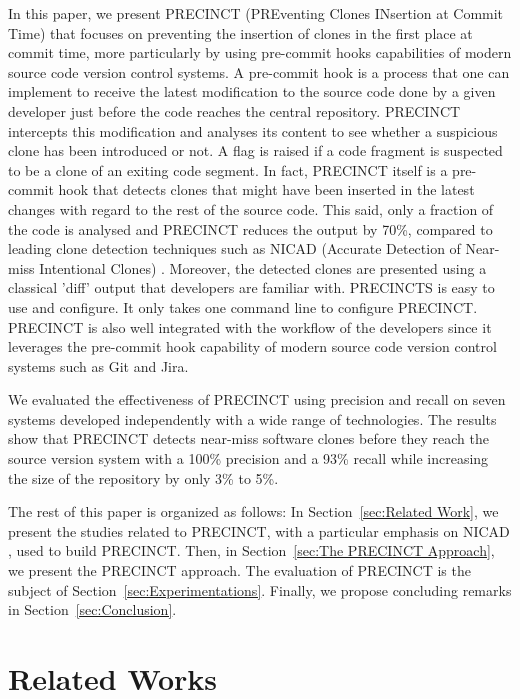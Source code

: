 \documentclass[conference]{IEEEtran}
\begin{document}
In this paper, we present PRECINCT (PREventing Clones INsertion at Commit Time) that focuses on preventing the insertion of clones in the first place at commit time, more particularly by  using pre-commit hooks capabilities of modern source code version control systems. A pre-commit hook is a process that one can implement to receive the latest modification to the source code done by a given developer just before the code reaches the central repository.  PRECINCT intercepts this modification and analyses its  content to see whether a suspicious clone has been introduced or not. A flag is raised if a code fragment is suspected to be a clone of an exiting code segment. In fact, PRECINCT itself is a pre-commit hook that detects clones that might have been inserted in the latest changes with regard to the rest of the source code. This said, only a fraction of the code is analysed and PRECINCT reduces the output by 70\%, compared to leading clone detection techniques such as NICAD (Accurate Detection of Near-miss Intentional Clones) \cite{Cordy2011}. Moreover, the detected clones are presented using a classical 'diff' output that developers are familiar with.  PRECINCTS is easy to use and configure. It only takes  one command line to configure PRECINCT. PRECINCT is also well integrated with the workflow of the developers since it leverages the pre-commit hook capability of modern source code version control systems such as Git and Jira.

We evaluated the effectiveness of PRECINCT using precision and recall on seven systems developed independently with a wide range of technologies. The results show that PRECINCT detects near-miss software clones before they reach the source version system with a 100\% precision and a 93\% recall while increasing the size of the repository by only 3\% to 5\%.

The rest of this paper is organized as follows: In Section~\ref{sec:Related Work}, we present the studies related to PRECINCT, with a particular emphasis on NICAD \cite{Cordy2011}, used to build PRECINCT. Then, in Section~\ref{sec:The PRECINCT Approach}, we present the PRECINCT approach. The evaluation of PRECINCT is the subject of  Section~\ref{sec:Experimentations}.
Finally, we propose concluding remarks in Section~\ref{sec:Conclusion}.

\section{Related Works}
\label{sec:Related Works}
\end{document}
